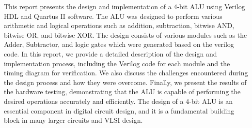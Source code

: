 This report presents the design and implementation of a
4-bit ALU using Verilog HDL and Quartus II software.
The ALU was designed to perform various arithmetic
and logical operations such as addition, subtraction,
bitwise AND, bitwise OR, and bitwise XOR. The design
consists of various modules such as the Adder, Subtractor,
and logic gates which were generated based on the verilog code.
In this report, we provide a detailed description of the design and implementation process,
including the Verilog code for each module and the timing diagram for verification.
We also discuss the challenges encountered during the design process and how they were overcome.
Finally, we present the results of the hardware testing, demonstrating that
the ALU is capable of performing the desired operations accurately and efficiently.
The design of a 4-bit ALU is an essential component in digital circuit design,
and it is a fundamental building block in many larger circuits and VLSI design.